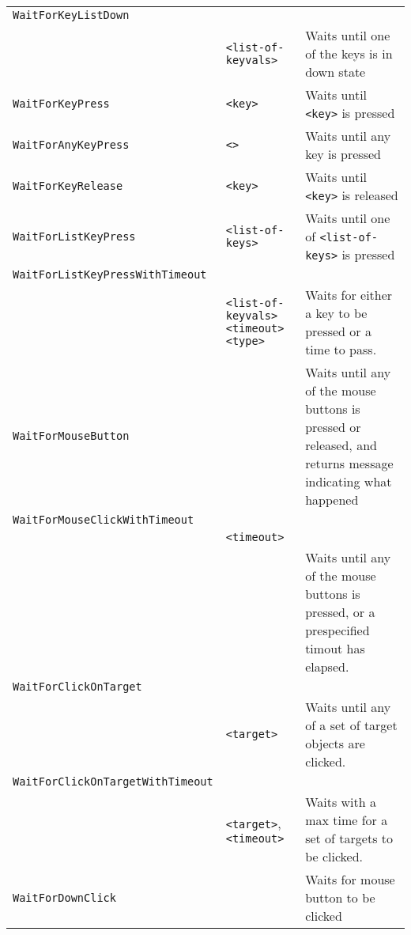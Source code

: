 \begin{longtable}{p{3cm}p{3cm}p{6cm}}
\verb+WaitForKeyListDown+ & & \\ 
& \verb+<list-of-keyvals>+ & Waits until one of the keys is in down state\\ 
\verb+WaitForKeyPress+ &\verb+<key>+ &Waits until \verb+<key>+ is pressed\\ 
\verb+WaitForAnyKeyPress+ &\hspace{0.5cm} \verb+<>+ &Waits until any key is pressed\\ 
\verb+WaitForKeyRelease+ &\hspace{0.5cm} \verb+<key>+ & Waits until \verb+<key>+ is released\\ 
\verb+WaitForListKeyPress+ &\hspace{0.5cm}\verb+<list-of-keys>+ &Waits until one of \verb+<list-of-keys>+ is pressed \\ 
\verb+WaitForListKeyPressWithTimeout+&\\
&\verb+<list-of-keyvals>+ \verb+<timeout>+ \verb+<type>+ & Waits for either a key to be pressed or a time to pass.\\
\verb+WaitForMouseButton+ & &Waits until any of the mouse buttons is pressed or released, and returns message indicating what happened \\ 
\verb+WaitForMouseClickWithTimeout+ \\&\verb+<timeout>+\\
& &Waits until any of the mouse buttons is pressed, or a prespecified timout has elapsed. \\ 
\verb+WaitForClickOnTarget+ \\
&\verb+<target>+ &Waits until any of a set of target objects are clicked.\\ 
\verb+WaitForClickOnTargetWithTimeout+\\
     &\verb+<target>+, \verb+<timeout>+ &Waits with a max time for a set of targets to be clicked.\\ 
\verb+WaitForDownClick+ & &Waits for mouse button to be clicked \\ 


\end{longtable}
